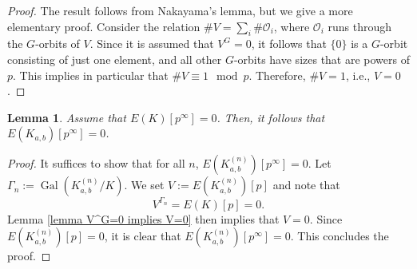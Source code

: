 \documentclass[12pt]{amsart}
\newtheorem{lemma}[theorem]{Lemma}
\newcommand{\op}[1]{\operatorname{#1}}
\numberwithin{equation}{section}
\begin{document}
\begin{proof}
The result follows from Nakayama's lemma, but we give a more elementary proof. Consider the relation $\# V = \sum_i \# \mathcal{O}_i$, where $\mathcal{O}_i$ runs through the $G$-orbits of $V$. Since it is assumed that $V^G = 0$, it follows that $\{0\}$ is a $G$-orbit consisting of just one element, and all other $G$-orbits have sizes that are powers of $p$. This implies in particular that $\# V\equiv 1\mod{p}$. Therefore, $\#V=1$, i.e., $V=0$.
\end{proof}

\begin{lemma}\label{trivial lemma}
    Assume that $E(K)[p^\infty]=0$. Then, it follows that $E(K_{a,b})[p^\infty]=0$. 
\end{lemma}
\begin{proof}
    It suffices to show that for all $n$, $E(K_{a,b}^{(n)})[p^\infty]=0$. Let $\Gamma_n:=\op{Gal}(K_{a,b}^{(n)}/K)$. We set $V:=E(K_{a,b}^{(n)})[p]$ and note that 
    \[V^{\Gamma_n}=E(K)[p]=0.\] Lemma \ref{lemma V^G=0 implies V=0} then implies that $V=0$. Since $E(K_{a,b}^{(n)})[p]=0$, it is clear that $E(K_{a,b}^{(n)})[p^\infty]=0$. This concludes the proof.
\end{proof}
\end{document}
